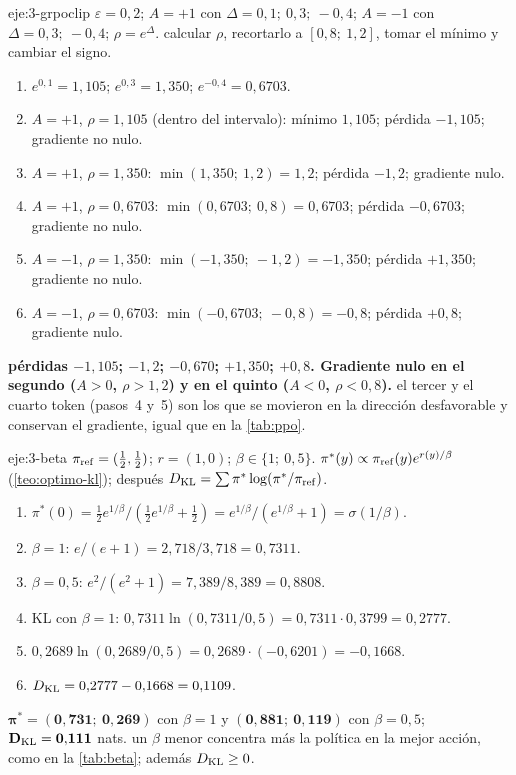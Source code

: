 \begin{solucion}{eje:3-grpoclip}
\datos $\varepsilon=0{,}2$; $A=+1$ con $\Delta=0{,}1;\ 0{,}3;\ -0{,}4$; $A=-1$ con $\Delta=0{,}3;\ -0{,}4$; $\rho=e^{\Delta}$.
\planteamiento calcular $\rho$, recortarlo a $[0{,}8;\ 1{,}2]$, tomar el mínimo y cambiar el signo.
\pasos
\begin{enumerate}[label=\arabic*.]
  \item $e^{0{,}1}=1{,}105$; $e^{0{,}3}=1{,}350$; $e^{-0{,}4}=0{,}6703$.
  \item $A=+1$, $\rho=1{,}105$ (dentro del intervalo): mínimo $1{,}105$; pérdida $-1{,}105$; gradiente no nulo.
  \item $A=+1$, $\rho=1{,}350$: $\min(1{,}350;\ 1{,}2)=1{,}2$; pérdida $-1{,}2$; gradiente nulo.
  \item $A=+1$, $\rho=0{,}6703$: $\min(0{,}6703;\ 0{,}8)=0{,}6703$; pérdida $-0{,}6703$; gradiente no nulo.
  \item $A=-1$, $\rho=1{,}350$: $\min(-1{,}350;\ -1{,}2)=-1{,}350$; pérdida $+1{,}350$; gradiente no nulo.
  \item $A=-1$, $\rho=0{,}6703$: $\min(-0{,}6703;\ -0{,}8)=-0{,}8$; pérdida $+0{,}8$; gradiente nulo.
\end{enumerate}
\resultado \textbf{pérdidas $-1{,}105$; $-1{,}2$; $-0{,}670$; $+1{,}350$; $+0{,}8$. Gradiente nulo en el segundo ($A>0$, $\rho>1{,}2$) y en el quinto ($A<0$, $\rho<0{,}8$).}
\comprobacion el tercer y el cuarto token (pasos~4 y~5) son los que se movieron en la dirección desfavorable y conservan el gradiente, igual que en la \cref{tab:ppo}.
\end{solucion}

\begin{solucion}{eje:3-beta}
\datos $\pi_{\mathrm{ref}}=(\tfrac12,\tfrac12)$; $r=(1,0)$; $\beta\in\{1;\ 0{,}5\}$.
\planteamiento $\pi^{*}(y)\propto\pi_{\mathrm{ref}}(y)e^{r(y)/\beta}$ (\cref{teo:optimo-kl}); después $D_{\mathrm{KL}}=\sum\pi^{*}\log(\pi^{*}/\pi_{\mathrm{ref}})$.
\pasos
\begin{enumerate}[label=\arabic*.]
  \item $\pi^{*}(0)=\tfrac12e^{1/\beta}/(\tfrac12e^{1/\beta}+\tfrac12)=e^{1/\beta}/(e^{1/\beta}+1)=\sigma(1/\beta)$.
  \item $\beta=1$: $e/(e+1)=2{,}718/3{,}718=0{,}7311$.
  \item $\beta=0{,}5$: $e^{2}/(e^{2}+1)=7{,}389/8{,}389=0{,}8808$.
  \item KL con $\beta=1$: $0{,}7311\ln(0{,}7311/0{,}5)=0{,}7311\cdot 0{,}3799=0{,}2777$.
  \item $0{,}2689\ln(0{,}2689/0{,}5)=0{,}2689\cdot(-0{,}6201)=-0{,}1668$.
  \item $D_{\mathrm{KL}}=0{,}2777-0{,}1668=0{,}1109$.
\end{enumerate}
\resultado $\mathbf{\pi^{*}=(0{,}731;\ 0{,}269)}$ con $\beta=1$ y $\mathbf{(0{,}881;\ 0{,}119)}$ con $\beta=0{,}5$; $\mathbf{D_{\mathrm{KL}}=0{,}111}$ nats.
\comprobacion un $\beta$ menor concentra más la política en la mejor acción, como en la \cref{tab:beta}; además $D_{\mathrm{KL}}\ge 0$.
\end{solucion}

